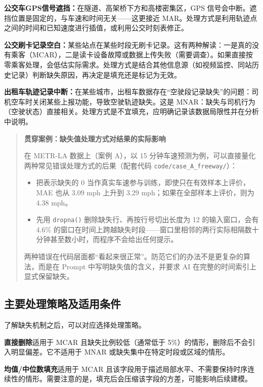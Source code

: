 \textbf{公交车GPS信号遮挡：}在隧道、高架桥下方和高楼密集区，GPS 信号会中断。遮挡位置是固定的，与车速和时间无关——这更接近 MAR。处理方式是利用轨迹点之间的时间和已知速度进行插值，或利用公交时刻表修正。

\textbf{公交刷卡记录空白：}某些站点在某些时段无刷卡记录。这有两种解读：一是真的没有乘客（MCAR），二是读卡设备故障或数据上传失败（需要调查）。如果直接按零乘客处理，会低估实际需求。处理方式是结合其他信息源（如视频监控、同站历史记录）判断缺失原因，再决定是填充还是标记为无效。

\textbf{出租车轨迹记录中断：}在某些城市，出租车数据存在“空驶段记录缺失”的问题：司机空车时关闭某些上报功能，导致空驶轨迹缺失。这是 MNAR：缺失与司机行为（空驶状态）直接相关。处理方式是不宜填充，应明确记录该数据局限性并在分析中说明。

\begin{quote}
\textbf{贯穿案例：缺失值处理方式对结果的实际影响}

在 METR-LA 数据上（案例 A），以 15 分钟车速预测为例，可以直接量化两种常见错误处理方式的后果（配套代码 \texttt{code/case\_A\_freeway/}）：

\begin{itemize}
  \item 把表示缺失的 0 当作真实车速参与训练，即使只在有效样本上评价，MAE 也从 3.09 mph 上升到 3.29 mph；如果在全部样本上评价，则为 4.38 mph。
  \item 先用 \texttt{dropna()} 删除缺失行、再按行号切出长度为 12 的输入窗口，会有 4.6\% 的窗口在时间上跨越缺失时段——窗口里相邻的两行实际相隔数十分钟甚至数小时，而程序不会给出任何提示。
\end{itemize}

两种错误在代码层面都“看起来很正常”。防范它们的办法不是更复杂的算法，而是在 Prompt 中写明缺失值的含义，并要求 AI 在完整的时间索引上显式保留缺失。
\end{quote}

\subsection{主要处理策略及适用条件}

了解缺失机制之后，可以对应选择处理策略。

\textbf{直接删除}适用于 MCAR 且缺失比例较低（通常低于 5\%）的情形，删除后不会引入明显偏差。它不适用于 MNAR 或缺失集中在特定时段或区域的情形。

\textbf{均值/中位数填充}适用于 MCAR 且该字段用于描述局部水平、不需要保持时序连续性的情形。需要注意的是，填充后会压缩该字段的方差，可能影响后续建模。

